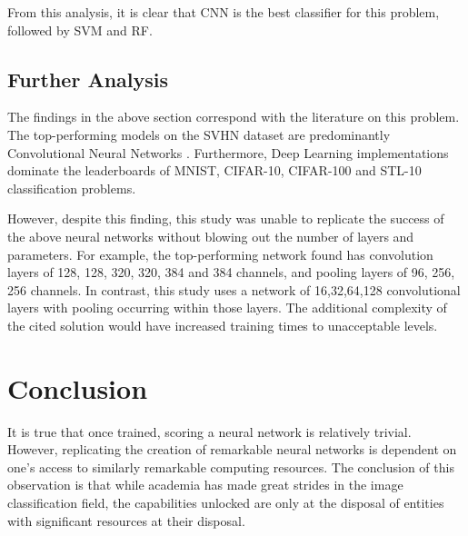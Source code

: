 \documentclass[11pt]{article}
\begin{document}
From this analysis, it is clear that CNN is the best classifier for this problem, followed by SVM and RF.


\subsection{Further Analysis}

The findings in the above section correspond with the literature on this problem. The top-performing models on the SVHN dataset are predominantly Convolutional Neural Networks \citep{problemperformance}. Furthermore, Deep Learning implementations dominate the leaderboards of MNIST, CIFAR-10, CIFAR-100 and STL-10 classification problems.

However, despite this finding, this study was unable to replicate the success of the above neural networks without blowing out the number of layers and parameters. For example, the top-performing network found has convolution layers of 128, 128, 320, 320, 384 and 384 channels, and pooling layers of 96, 256, 256 channels. In contrast, this study uses a network of 16,32,64,128 convolutional layers with pooling occurring within those layers. The additional complexity of the cited solution would have increased training times to unacceptable levels.



\section{Conclusion}

It is true that once trained, scoring a neural network is relatively trivial. However, replicating the creation of remarkable neural networks is dependent on one's access to similarly remarkable computing resources. The conclusion of this observation is that while academia has made great strides in the image classification field, the capabilities unlocked are only at the disposal of entities with significant resources at their disposal.

\medskip
 
\renewcommand\refname{Bibliography}

 
\end{document}

